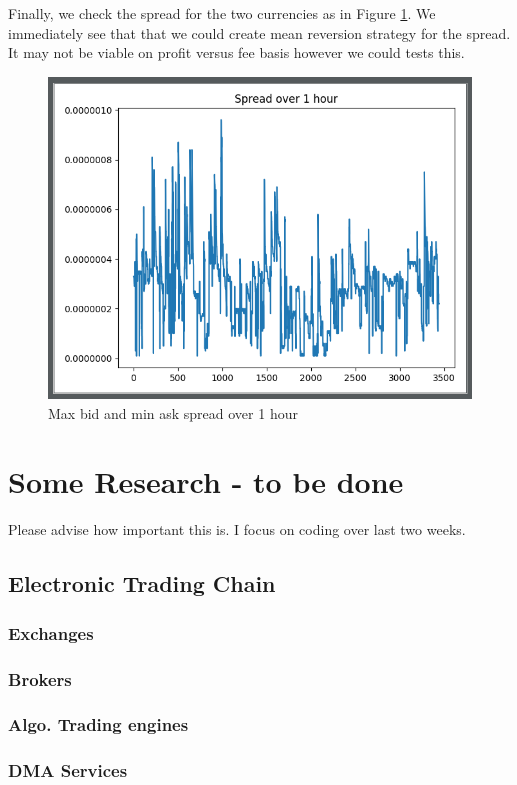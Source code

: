 \documentclass[12pt]{article}
\begin{document}
Finally, we check the spread for the two currencies as in Figure \ref{fig:plt4}. We immediately see that that we could create mean reversion strategy for the spread. It may not be viable on profit versus fee basis however we could tests this.

\begin{figure}[h!]
	\centering
  \includegraphics[scale=0.5]{plot4.png}
  \caption{Max bid and min ask spread over 1 hour}
  \label{fig:plt4}
\end{figure}

\section*{Some Research - to be done}
Please advise how important this is. I focus on coding over last two weeks.
\subsection{Electronic Trading Chain}
\label{sec:Chian}
\subsubsection{Exchanges}
\subsubsection{Brokers}
\subsubsection{Algo. Trading engines}
\subsubsection{DMA Services}
\end{document}
